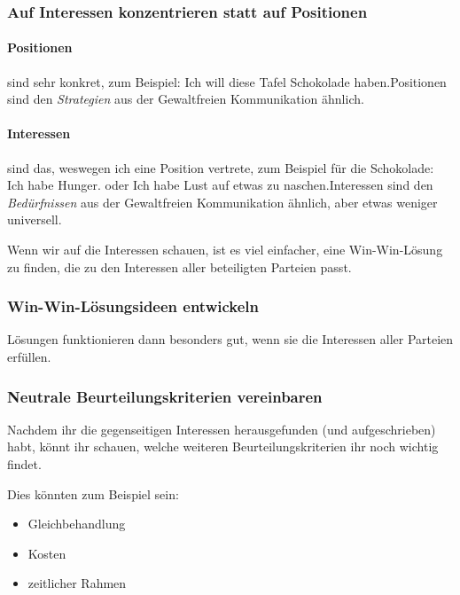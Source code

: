 \subsubsection{Auf Interessen konzentrieren statt auf Positionen}

\paragraph{Positionen} sind sehr konkret, zum Beispiel: \glqq Ich will diese Tafel Schokolade haben.\grqq Positionen sind den \emph{Strategien} aus der Gewaltfreien Kommunikation ähnlich.

\paragraph{Interessen} sind das, weswegen ich eine Position vertrete, zum Beispiel für die Schokolade: \glqq Ich habe Hunger.\grqq{} oder \glqq Ich habe Lust auf etwas zu naschen.\grqq Interessen sind den \emph{Bedürfnissen} aus der Gewaltfreien Kommunikation ähnlich, aber etwas weniger universell.

Wenn wir auf die Interessen schauen, ist es viel einfacher, eine Win-Win-Lösung zu finden, die zu den Interessen aller beteiligten Parteien passt.

\subsubsection{Win-Win-Lösungsideen entwickeln}

Lösungen funktionieren dann besonders gut, wenn sie die Interessen aller Parteien erfüllen.

\subsubsection{Neutrale Beurteilungskriterien vereinbaren}

Nachdem ihr die gegenseitigen Interessen herausgefunden (und aufgeschrieben) habt, könnt ihr schauen, welche weiteren Beurteilungskriterien ihr noch wichtig findet.

Dies könnten zum Beispiel sein:

\begin{itemize}
    \item Gleichbehandlung
    \item Kosten
    \item zeitlicher Rahmen
\end{itemize}

